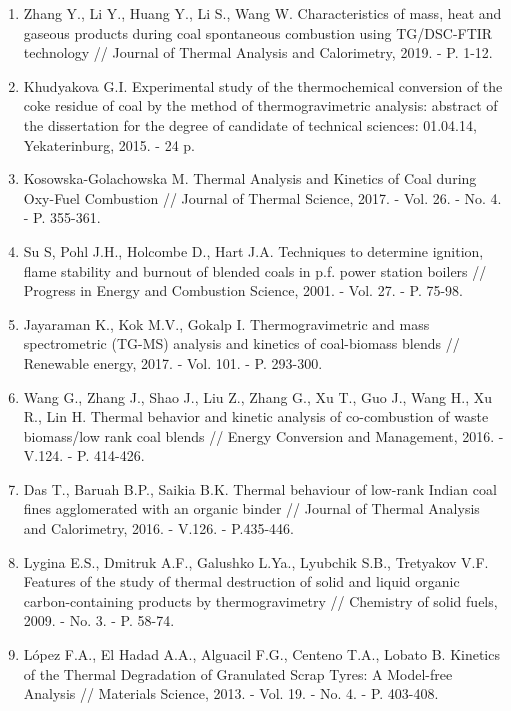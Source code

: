 \begin{enumerate}
\item
Zhang Y., Li Y., Huang Y., Li S., Wang W. Characteristics of mass,
heat and gaseous products during coal spontaneous combustion using
TG/DSC-FTIR technology // Journal of Thermal Analysis and Calorimetry,
2019. - P. 1-12.

\item
Khudyakova G.I. Experimental study of the thermochemical conversion
of the coke residue of coal by the method of thermogravimetric analysis:
abstract of the dissertation for the degree of candidate of technical
sciences: 01.04.14, Yekaterinburg, 2015. - 24 p.

\item
Kosowska-Golachowska M. Thermal Analysis and Kinetics of Coal during
Oxy-Fuel Combustion // Journal of Thermal Science, 2017. - Vol. 26. -
No. 4. - P. 355-361.

\item
Su S, Pohl J.H., Holcombe D., Hart J.A. Techniques to determine
ignition, flame stability and burnout of blended coals in p.f. power
station boilers // Progress in Energy and Combustion Science, 2001. -
Vol. 27. - P. 75-98.

\item
Jayaraman K., Kok M.V., Gokalp I. Thermogravimetric and mass
spectrometric (TG-MS) analysis and kinetics of coal-biomass blends //
Renewable energy, 2017. - Vol. 101. - P. 293-300.

\item
Wang G., Zhang J., Shao J., Liu Z., Zhang G., Xu T., Guo J., Wang H.,
Xu R., Lin H. Thermal behavior and kinetic analysis of co-combustion of
waste biomass/low rank coal blends // Energy Conversion and Management,
2016. - V.124. - P. 414-426.

\item
Das T., Baruah B.P., Saikia B.K. Thermal behaviour of low-rank Indian
coal fines agglomerated with an organic binder // Journal of Thermal
Analysis and Calorimetry, 2016. - V.126. - P.435-446.

\item
Lygina E.S., Dmitruk A.F., Galushko L.Ya., Lyubchik S.B., Tretyakov
V.F. Features of the study of thermal destruction of solid and liquid
organic carbon-containing products by thermogravimetry // Chemistry of
solid fuels, 2009. - No. 3. - P. 58-74.

\item
López F.A., El Hadad A.A., Alguacil F.G., Centeno T.A., Lobato B.
Kinetics of the Thermal Degradation of Granulated Scrap Tyres: A
Model-free Analysis // Materials Science, 2013. - Vol. 19. - No. 4. -
P. 403-408.


\end{enumerate}
